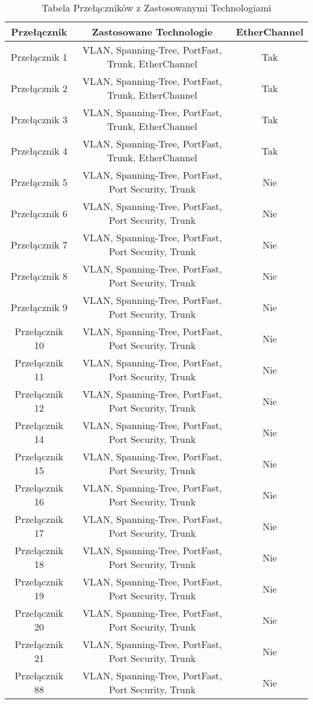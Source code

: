 \begin{table}[htbp]
\centering
\caption{Tabela Przełączników z Zastosowanymi Technologiami}
\begin{tabular}{|c|c|c|}
\hline
\textbf{Przełącznik} & \textbf{Zastosowane Technologie}       & \textbf{EtherChannel} \\ \hline
Przełącznik 1        & VLAN, Spanning-Tree, PortFast, Trunk, EtherChannel & Tak \\ \hline
Przełącznik 2        & VLAN, Spanning-Tree, PortFast, Trunk, EtherChannel & Tak \\ \hline
Przełącznik 3        & VLAN, Spanning-Tree, PortFast, Trunk, EtherChannel & Tak \\ \hline
Przełącznik 4        & VLAN, Spanning-Tree, PortFast, Trunk, EtherChannel & Tak \\ \hline
Przełącznik 5        & VLAN, Spanning-Tree, PortFast, Port Security, Trunk & Nie \\ \hline
Przełącznik 6        & VLAN, Spanning-Tree, PortFast, Port Security, Trunk & Nie \\ \hline
Przełącznik 7        & VLAN, Spanning-Tree, PortFast, Port Security, Trunk & Nie \\ \hline
Przełącznik 8        & VLAN, Spanning-Tree, PortFast, Port Security, Trunk & Nie \\ \hline
Przełącznik 9        & VLAN, Spanning-Tree, PortFast, Port Security, Trunk & Nie \\ \hline
Przełącznik 10       & VLAN, Spanning-Tree, PortFast, Port Security, Trunk & Nie \\ \hline
Przełącznik 11       & VLAN, Spanning-Tree, PortFast, Port Security, Trunk & Nie \\ \hline
Przełącznik 12       & VLAN, Spanning-Tree, PortFast, Port Security, Trunk & Nie \\ \hline
Przełącznik 14       & VLAN, Spanning-Tree, PortFast, Port Security, Trunk & Nie \\ \hline
Przełącznik 15       & VLAN, Spanning-Tree, PortFast, Port Security, Trunk & Nie \\ \hline
Przełącznik 16       & VLAN, Spanning-Tree, PortFast, Port Security, Trunk & Nie \\ \hline
Przełącznik 17       & VLAN, Spanning-Tree, PortFast, Port Security, Trunk & Nie \\ \hline
Przełącznik 18       & VLAN, Spanning-Tree, PortFast, Port Security, Trunk & Nie \\ \hline
Przełącznik 19       & VLAN, Spanning-Tree, PortFast, Port Security, Trunk & Nie \\ \hline
Przełącznik 20       & VLAN, Spanning-Tree, PortFast, Port Security, Trunk & Nie \\ \hline
Przełącznik 21       & VLAN, Spanning-Tree, PortFast, Port Security, Trunk & Nie \\ \hline
Przełącznik 88       & VLAN, Spanning-Tree, PortFast, Port Security, Trunk & Nie \\ \hline
\end{tabular}
\end{table}

